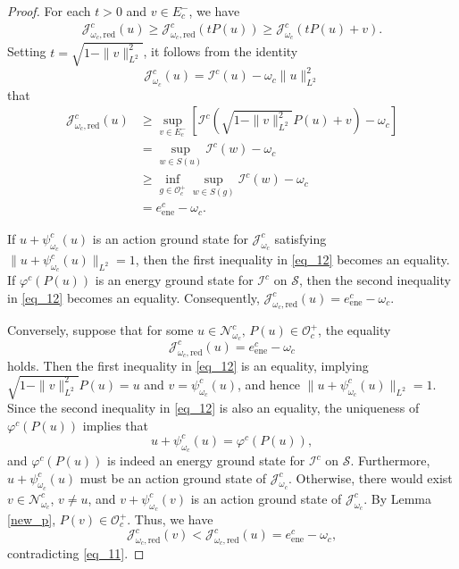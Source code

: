 \documentclass{amsart}
\theoremstyle{plain}
\theoremstyle{definition}
\theoremstyle{remark}
\numberwithin{equation}{section} \numberwithin{figure}{section}
\begin{document}
\begin{proof}
For each $t>0$ and $v \in E_c^-$, we have
\begin{equation}
  \begin{split}
      \mathcal{J}^c_{\omega_c,\mathrm{red}}(u) \geq \mathcal{J}^c_{\omega_c,\mathrm{red}}(tP(u)) \geq \mathcal{J}^c_{\omega_c}(tP(u) + v).
  \end{split}
\end{equation}
Setting $t = \sqrt{1 - \|v\|_{L^2}^2}$, it follows from the identity
\[
\mathcal{J}^c_{\omega_c}(u) = \mathcal{I}^c(u) - \omega_c\|u\|_{L^2}^2
\]
that
\begin{equation}\label{eq_12}
  \begin{split}
      \mathcal{J}^c_{\omega_c,\mathrm{red}}(u) &\geq \sup_{v \in E_c^-} \left[ \mathcal{I}^c\left( \sqrt{1 - \|v\|_{L^2}^2} P(u) + v \right) -\omega_c \right] \\
      &= \sup_{w \in S(u)} \mathcal{I}^c(w) -\omega_c \\
      &\geq \inf_{g \in \mathcal{O}_c^+} \sup_{w \in S(g)} \mathcal{I}^c(w) -\omega_c \\
      &= e_{\mathrm{ene}}^c -\omega_c.
  \end{split}
\end{equation}

If $u + \psi_{\omega_c}^c(u)$ is an action ground state for $\mathcal{J}^c_{\omega_c}$ satisfying $\|u + \psi_{\omega_c}^c(u)\|_{L^2} = 1$, then the first inequality in \eqref{eq_12} becomes an equality.
If $ \varphi^c(P(u))$ is an energy ground state for $\mathcal{I}^c$ on $\mathcal{S}$, then the second inequality in \eqref{eq_12} becomes an equality. Consequently,
$
  \mathcal{J}^c_{\omega_c,\mathrm{red}}(u) = e_{\mathrm{ene}}^c -\omega_c.
$

Conversely, suppose that for some $u \in \mathcal{N}_{\omega_c}^c,\,P(u)\in \mathcal{O}_c^+$, the equality
\begin{equation*}
  \mathcal{J}^c_{\omega_c,\mathrm{red}}(u) = e_{\mathrm{ene}}^c -\omega_c
\end{equation*}
holds. Then the first inequality in \eqref{eq_12} is an equality, implying $\sqrt{1 - \|v\|_{L^2}^2}P(u) = u$ and $v = \psi_{\omega_c}^c(u)$, and hence $\|u + \psi_{\omega_c}^c(u)\|_{L^2} = 1$.
Since the second inequality in \eqref{eq_12} is also an equality, the uniqueness of $\varphi^c(P(u))$ implies that
\[
u + \psi_{\omega_c}^c(u) = \varphi^c(P(u)),
\]
and $\varphi^c(P(u))$ is indeed an energy ground state for $\mathcal{I}^c$ on $\mathcal{S}$.
Furthermore, $u + \psi_{\omega_c}^c(u)$ must be an action ground state of $\mathcal{J}_{\omega_c}^c$. 
Otherwise, there would exist $v \in \mathcal{N}_{\omega_c}^c$, $v \neq u$, and $v+\psi_{\omega_c}^c(v)$ is an action ground state of $\mathcal{J}_{\omega_c}^c$.
By Lemma \ref{new_p}, \(P(v) \in \mathcal{O}_c^+\). Thus, we have
\[
\mathcal{J}_{\omega_c,\mathrm{red}}^c(v) < \mathcal{J}^c_{\omega_c,\mathrm{red}}(u) = e_{\mathrm{ene}}^c -\omega_c,
\]
contradicting \eqref{eq_11}.
\end{proof}
\end{document}
